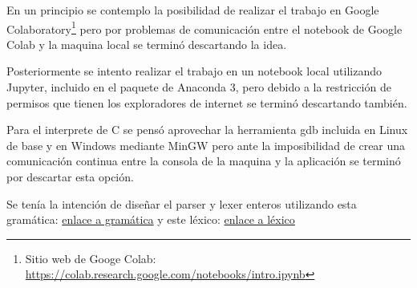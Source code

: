 
En un principio se contemplo la posibilidad de realizar el trabajo en Google Colaboratory\footnote{Sitio web de Googe Colab: \url{https://colab.research.google.com/notebooks/intro.ipynb}} pero por problemas de comunicación entre el notebook de Google Colab y la maquina local se terminó descartando la idea.

Posteriormente se intento realizar el trabajo en un notebook local utilizando Jupyter, incluido en el paquete de Anaconda 3, pero debido a la restricción de permisos que tienen los exploradores de internet se terminó descartando también.

Para el interprete de C se pensó aprovechar la herramienta gdb incluida en Linux de base y en Windows mediante MinGW pero ante la imposibilidad de crear una comunicación continua entre la consola de la maquina y la aplicación se terminó por descartar esta opción.

Se tenía la intención de diseñar el parser y lexer enteros utilizando esta gramática: \href{https://www.lysator.liu.se/c/ANSI-C-grammar-y.html}{enlace a gramática} y este léxico: \href{https://www.lysator.liu.se/c/ANSI-C-grammar-l.html}{enlace a léxico}